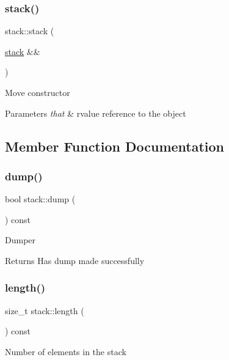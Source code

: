 \subsubsection{\texorpdfstring{stack()}{stack()}\hspace{0.1cm}{\footnotesize\ttfamily [3/3]}}
{\footnotesize\ttfamily stack\+::stack (\begin{DoxyParamCaption}\item[{\hyperlink{classstack}{stack} \&\&}]{ }\end{DoxyParamCaption})}

Move constructor


\begin{DoxyParams}{Parameters}
{\em that} & rvalue reference to the object \\
\hline
\end{DoxyParams}


\subsection{Member Function Documentation}
\mbox{\label{classstack_a8a37d01fe5845ebf19d1f30921b93a51}} 
\subsubsection{\texorpdfstring{dump()}{dump()}}
{\footnotesize\ttfamily bool stack\+::dump (\begin{DoxyParamCaption}{ }\end{DoxyParamCaption}) const}

Dumper

\begin{DoxyReturn}{Returns}
Has dump made successfully 
\end{DoxyReturn}
\mbox{\label{classstack_ad6340374ef03a5259458b8f24351b61f}} 
\subsubsection{\texorpdfstring{length()}{length()}}
{\footnotesize\ttfamily size\+\_\+t stack\+::length (\begin{DoxyParamCaption}{ }\end{DoxyParamCaption}) const}

Number of elements in the stack

